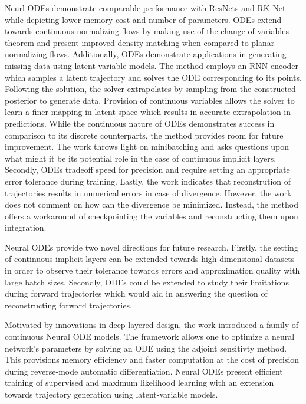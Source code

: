 \documentclass[11pt,letterpaper]{article}
\begin{document}
Neurl ODEs demonstrate comparable performance with ResNets and RK-Net while depicting lower memory cost and number of parameters. ODEs extend towards continuous normalizing flows by making use of the change of variables theorem and present improved density matching when compared to planar normalizing flows. Additionally, ODEs demonstrate applications in generating missing data using latent variable models. The method employs an RNN encoder which samples a latent trajectory and solves the ODE corresponding to its points. Following the solution, the solver extrapolates by sampling from the constructed posterior to generate data. Provision of continuous variables allows the solver to learn a finer mapping in latent space which results in accurate extrapolation in predictions. While the continuous nature of ODEs demonstrates success in comparison to its discrete counterparts, the method provides room for future improvement. The work throws light on minibatching and asks questions upon what might it be its potential role in the case of continuous implicit layers. Secondly, ODEs tradeoff speed for precision and require setting an appropriate error tolerance during training. Lastly, the work indicates that reconstrution of trajectories results in numerical errors in case of divergence. However, the work does not comment on how can the divergence be minimized. Instead, the method offers a workaround of checkpointing the variables and reconstructing them upon integration. 

Neural ODEs provide two novel directions for future research. Firstly, the setting of continuous implicit layers can be extended towards high-dimensional datasets in order to observe their tolerance towards errors and approximation quality with large batch sizes. Secondly, ODEs could be extended to study their limitations during forward trajectories which would aid in answering the question of reconstructing forward trajectories. 

Motivated by innovations in deep-layered design, the work introduced a family of continuous Neural ODE models. The framework allows one to optimize a neural network's parameters by solving an ODE using the adjoint sensitivty method. This provisions memory efficiency and faster computation at the cost of precision during reverse-mode automatic differentiation. Neural ODEs present efficient training of supervised and maximum likelihood learning with an extension towards trajectory generation using latent-variable models. 
\end{document}
